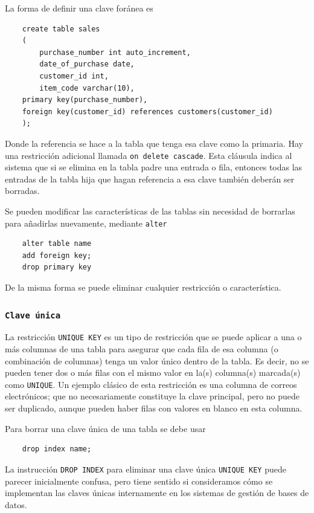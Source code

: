     La forma de definir una clave foránea es 

    \begin{verbatim}
    create table sales
    (
        purchase_number int auto_increment,
        date_of_purchase date,
        customer_id int,
        item_code varchar(10),
    primary key(purchase_number),
    foreign key(customer_id) references customers(customer_id)
    );
    \end{verbatim}
    Donde la referencia se hace a la tabla que tenga esa clave como la primaria. Hay una restricción adicional llamada \texttt{on delete cascade}. Esta cláusula indica al sistema que si se elimina en la tabla padre una entrada o fila, entonces todas las entradas de la tabla hija que hagan referencia a esa clave también deberán ser borradas. 

    Se pueden modificar las características de las tablas sin necesidad de borrarlas para añadirlas nuevamente, mediante \texttt{alter}

    \begin{verbatim}
    alter table name
    add foreign key;
    drop primary key
    \end{verbatim}
    De la misma forma se puede eliminar cualquier restricción o característica.

    \subsubsection{\texttt{Clave única}}

    La restricción \verb|UNIQUE KEY|  es un tipo de restricción que se puede aplicar a una o más columnas de una tabla para asegurar que cada fila de esa columna (o combinación de columnas) tenga un valor único dentro de la tabla. Es decir, no se pueden tener dos o más filas con el mismo valor en la(s) columna(s) marcada(s) como \verb|UNIQUE|. Un ejemplo clásico de esta restricción es una columna de correos electrónicos; que no necesariamente constituye la clave principal, pero no puede ser duplicado, aunque pueden haber filas con valores en blanco en esta columna.

    Para borrar una clave única de una tabla se debe usar
    \begin{verbatim}
    drop index name;
    \end{verbatim}
    La instrucción \texttt{DROP INDEX} para eliminar una clave única \texttt{UNIQUE KEY} puede parecer inicialmente confusa, pero tiene sentido si consideramos cómo se implementan las claves únicas internamente en los sistemas de gestión de bases de datos.

